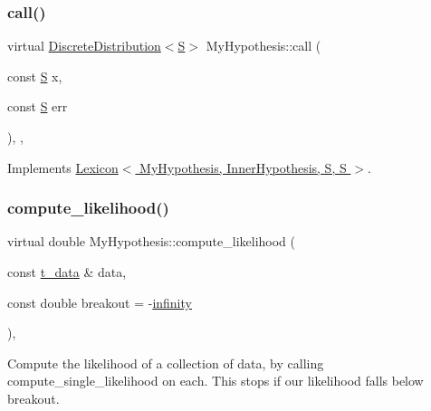 \subsubsection{\texorpdfstring{call()}{call()}}
{\footnotesize\ttfamily virtual \hyperlink{class_discrete_distribution}{Discrete\+Distribution}$<$\hyperlink{_formal_language_theory-_complex_2_main_8cpp_a51c40915539205f0b5add30b0d68a4cb}{S}$>$ My\+Hypothesis\+::call (\begin{DoxyParamCaption}\item[{const \hyperlink{_formal_language_theory-_complex_2_main_8cpp_a51c40915539205f0b5add30b0d68a4cb}{S}}]{x,  }\item[{const \hyperlink{_formal_language_theory-_complex_2_main_8cpp_a51c40915539205f0b5add30b0d68a4cb}{S}}]{err }\end{DoxyParamCaption})\hspace{0.3cm}{\ttfamily [inline]}, {\ttfamily [override]}, {\ttfamily [virtual]}}



Implements \hyperlink{class_lexicon_aaaff682145f9cb15f7252420fe76f111}{Lexicon$<$ My\+Hypothesis, Inner\+Hypothesis, S, S $>$}.

\mbox{\label{class_my_hypothesis_a85348639689176eaf456aaadd63cef2f}} 
\subsubsection{\texorpdfstring{compute\+\_\+likelihood()}{compute\_likelihood()}\hspace{0.1cm}{\footnotesize\ttfamily [1/2]}}
{\footnotesize\ttfamily virtual double My\+Hypothesis\+::compute\+\_\+likelihood (\begin{DoxyParamCaption}\item[{const \hyperlink{class_bayesable_a70a593a67c7d43239ecc06bb4fd06a6b}{t\+\_\+data} \&}]{data,  }\item[{const double}]{breakout = {\ttfamily -\/\hyperlink{_numerics_8h_a1bb1e42ae1b40cad6e99da0aab8a5576}{infinity}} }\end{DoxyParamCaption})\hspace{0.3cm}{\ttfamily [inline]}, {\ttfamily [virtual]}}



Compute the likelihood of a collection of data, by calling compute\+\_\+single\+\_\+likelihood on each. This stops if our likelihood falls below breakout. 


